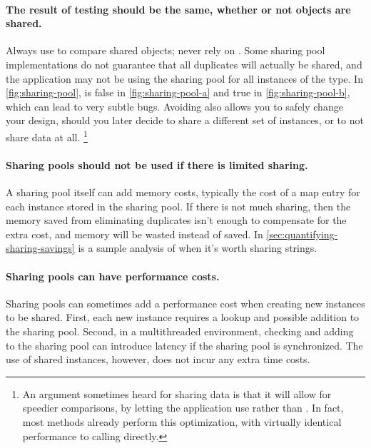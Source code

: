 \paragraph{The result of  testing should be the same,
whether or not objects are shared.}
Always use  to compare shared objects; never rely on \code{==}.
Some sharing pool implementations do not guarantee that all
duplicates will actually be shared, and the application may not be using the
sharing pool for all instances of the type. In \autoref{fig:sharing-pool},
 is false in \ref{fig:sharing-pool-a} and true in
\ref{fig:sharing-pool-b}, which can lead to very subtle bugs.
Avoiding \code{==} also allows
you to safely change your design, should you later decide to share a different set of instances,
or to not share data at all.
\footnote{An argument sometimes heard for sharing data is that it will
allow for speedier comparisons, by letting the application use \code{==} rather
than . In fact, most
 methods already perform this optimization, with virtually
identical performance to calling \code{==} directly.}
 
\paragraph{Sharing pools should not be used if there is limited sharing.}
A sharing pool itself can add
memory costs, typically the cost of a map entry for each instance stored in the
sharing pool.
If there is not much sharing, then the memory saved from
eliminating duplicates isn't enough to compensate for the
extra cost, and memory will be wasted instead of saved.  In \autoref{sec:quantifying-sharing-savings} is
a sample analysis of when it's worth sharing strings.


\paragraph{Sharing pools can have performance costs.}
Sharing pools can sometimes add a performance cost when creating new instances
to be shared.  First, each new instance requires a lookup and possible
addition to the sharing pool. Second, in a multithreaded
environment, checking and adding to the sharing pool can introduce latency if the sharing pool is synchronized.
The use of shared instances, however, does not incur any extra
time costs.

